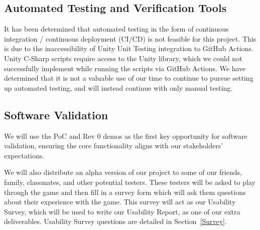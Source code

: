 \documentclass[12pt, titlepage]{article}
\begin{document}

\subsection{Automated Testing and Verification Tools}
It has been determined that automated testing in the form of continuous integration /
continuous deployment (CI/CD) is not feasible for this project. This is due to the
inaccessibility of Unity Unit Testing integration to GitHub Actions. Unity C-Sharp scripts
require access to the Unity library, which we could not successfully implement while
running the scripts via GitHub Actions. We have determined that it is not a valuable
use of our time to continue to pursue setting up automated testing, and will instead
continue with only manual testing.

\subsection{Software Validation}

We will use the PoC and Rev 0 demos as the first key opportunity for
software validation, ensuring the core functionality aligns with our stakeholders' expectations.

We will also distribute an alpha version of our project to some of our friends, family, classmates,
and other potential testers. These testers will be asked to play through the game and then fill in
a survey form which will ask them questions about their experience with the game.
This survey will act as our Usability Survey, which will be used to write our
Usability Report, as one of our extra deliverables. Usability Survey questions are detailed in
Section~\ref{Survey}.
\end{document}
